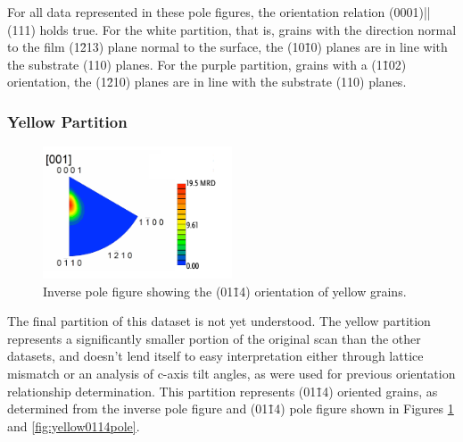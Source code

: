 For all data represented in these pole figures, the orientation relation
(0001)||(111) holds true. For the white partition, that is, grains
with the direction normal to the film (1\={2}13) plane normal to the surface, the
(10\={1}0) planes are in line with the substrate (110) planes. For the purple partition,
grains with a (1\={1}02) orientation, the (1\={2}10) planes are in line with the substrate
(110) planes. 


\subsubsection{Yellow Partition}
\label{subsubsec:single.growth.yellow}

\begin{figure}
\centering
\includegraphics[width=0.5\textwidth]{yellowipf.pdf}
\caption[Inverse pole figure showing orientation of  yellow grains]{%
Inverse pole figure showing the (01\={1}4) orientation of yellow grains.}
\label{fig:yellowipf}

\end{figure}
The final partition of this dataset is not yet understood. The yellow partition represents
a significantly smaller portion of the original scan than the other datasets, and doesn't
lend itself to easy interpretation either through lattice mismatch or an analysis of
c-axis tilt angles, as were used for previous orientation relationship determination. This
partition represents (01\={1}4) oriented grains, as determined from the inverse pole
figure and (01\={1}4) pole figure shown in Figures \ref{fig:yellowipf} and
\ref{fig:yellow0114pole}.

